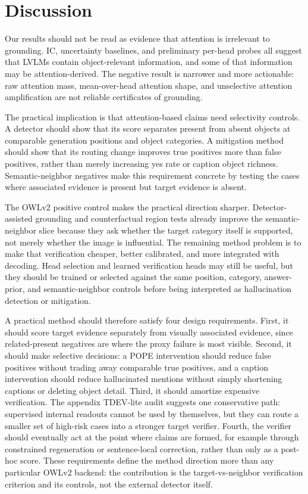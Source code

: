 \section{Discussion}
\label{sec:discussion}

\noindent Our results should not be read as evidence that attention is irrelevant to grounding. IC, uncertainty baselines, and preliminary per-head probes all suggest that LVLMs contain object-relevant information, and some of that information may be attention-derived. The negative result is narrower and more actionable: raw attention mass, mean-over-head attention shape, and unselective attention amplification are not reliable certificates of grounding.

\noindent The practical implication is that attention-based claims need selectivity controls. A detector should show that its score separates present from absent objects at comparable generation positions and object categories. A mitigation method should show that its routing change improves true positives more than false positives, rather than merely increasing yes rate or caption object richness. Semantic-neighbor negatives make this requirement concrete by testing the cases where associated evidence is present but target evidence is absent.

\noindent The OWLv2 positive control makes the practical direction sharper. Detector-assisted grounding and counterfactual region tests already improve the semantic-neighbor slice because they ask whether the target category itself is supported, not merely whether the image is influential. The remaining method problem is to make that verification cheaper, better calibrated, and more integrated with decoding. Head selection and learned verification heads may still be useful, but they should be trained or selected against the same position, category, answer-prior, and semantic-neighbor controls before being interpreted as hallucination detection or mitigation.

\noindent A practical method should therefore satisfy four design requirements. First, it should score target evidence separately from visually associated evidence, since related-present negatives are where the proxy failure is most visible. Second, it should make selective decisions: a POPE intervention should reduce false positives without trading away comparable true positives, and a caption intervention should reduce hallucinated mentions without simply shortening captions or deleting object detail. Third, it should amortize expensive verification. The appendix TDEV-lite audit suggests one conservative path: supervised internal readouts cannot be used by themselves, but they can route a smaller set of high-risk cases into a stronger target verifier. Fourth, the verifier should eventually act at the point where claims are formed, for example through constrained regeneration or sentence-local correction, rather than only as a post-hoc score. These requirements define the method direction more than any particular OWLv2 backend: the contribution is the target-vs-neighbor verification criterion and its controls, not the external detector itself.
